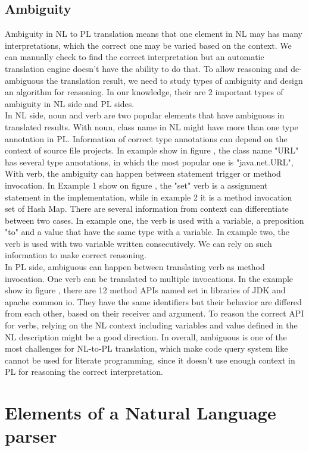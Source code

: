 \subsection{Ambiguity}
Ambiguity in NL to PL translation means that one element in NL may has many interpretations, which the correct one may be varied based on the context. We can manually check to find the correct interpretation but an automatic translation engine doesn't have the ability to do that. To allow reasoning and de-ambiguous the translation result, we need to study types of ambiguity and design an algorithm for reasoning. In our knowledge, their are 2 important types of ambiguity in NL side and PL sides. \\
In NL side, noun and verb are two popular elements that have ambiguous in translated results. With noun, class name in NL might have more than one type annotation in PL. Information of correct type annotations can depend on the context of source file projects. In example show in figure \cite{}, the class name "URL" has several type annotations, in which the most popular one is "java.net.URL", With verb, the ambiguity can happen between statement trigger or method invocation. In Example 1 show on figure \cite{}, the "set" verb is a assignment statement in the implementation, while in example 2 it is a method invocation set of Hash Map. There are several information from context can differentiate between two cases. In example one, the verb is used with a variable, a preposition "to" and a value that have the same type with a variable. In example two, the verb is used with two variable written consecutively. We can rely on such information to make correct reasoning.  \\
In PL side, ambiguous can happen between translating verb as method invocation. One verb can be translated to multiple invocations. In the example show in figure \cite{}, there are 12 method APIs named set in libraries of JDK and apache common io. They have the same identifiers but their behavior are differed from each other, based on their receiver and argument. To reason the correct API for verbs, relying on the NL context including variables and value defined in the NL description might be a good direction. In overall, ambiguous is one of the most challenges for NL-to-PL translation, which make code query system like \cite{} cannot be used for literate programming, since it doesn't use enough context in PL for reasoning the correct interpretation. 
     
\section{Elements  of a Natural Language parser}

